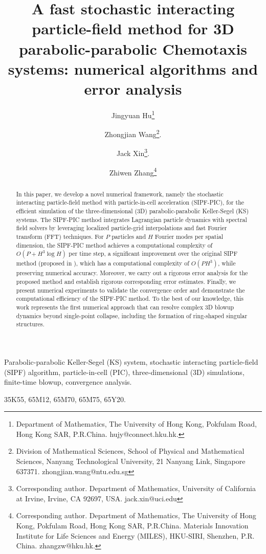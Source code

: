\documentclass[review,onefignum,onetabnum]{siamart250211}
\title{A fast stochastic interacting particle-field method for 3D parabolic-parabolic Chemotaxis  systems: numerical algorithms and error analysis}
\author{Jingyuan Hu\thanks{Department of Mathematics, The University of Hong Kong, Pokfulam Road, Hong Kong SAR,
P.R.China. hujy@connect.hku.hk.}
\and Zhongjian Wang\thanks{Division of Mathematical Sciences, School of Physical and Mathematical Sciences, Nanyang Technological University, 21 Nanyang Link, Singapore 637371. zhongjian.wang@ntu.edu.sg}.
\and Jack Xin\thanks{Corresponding author. Department of Mathematics, University of California at Irvine, Irvine, CA 92697, USA.
jack.xin@uci.edu}.
\and Zhiwen Zhang\thanks{Corresponding author. Department of Mathematics, The University of Hong Kong, Pokfulam
Road, Hong Kong SAR, P.R.China. Materials Innovation Institute for Life Sciences and Energy
(MILES), HKU-SIRI, Shenzhen, P.R. China. zhangzw@hku.hk.}
}
\date{}
\begin{document}
\maketitle



\begin{abstract}
In this paper, we develop a novel numerical framework, namely the stochastic interacting particle-field method with particle-in-cell acceleration (SIPF-PIC), for the efficient simulation of the three-dimensional (3D) parabolic-parabolic Keller-Segel (KS) systems. The SIPF-PIC method integrates Lagrangian particle dynamics with spectral field solvers by leveraging localized particle-grid interpolations and fast Fourier transform (FFT) techniques. For $P$ particles and $H$ Fourier modes per spatial dimension, the SIPF-PIC method achieves a computational complexity of $O(P + H^3 \log H)$ per time step, a significant improvement over the original SIPF method (proposed in \cite{SIPF1}), which has a computational complexity of $O(PH^3)$, while preserving numerical accuracy. Moreover, we carry out a rigorous error analysis for the proposed method and establish rigorous corresponding error estimates. Finally, we present numerical experiments to validate the convergence order and demonstrate the computational efficiency of the SIPF-PIC method. To the best of our knowledge, this work represents the first numerical approach that can resolve complex 3D blowup dynamics beyond single-point collapse, including the formation of ring-shaped singular structures.



\end{abstract}

\begin{keywords}
Parabolic-parabolic Keller-Segel (KS) system, stochastic interacting particle-field (SIPF) algorithm, particle-in-cell (PIC), three-dimensional (3D) simulations, finite-time blowup, convergence analysis.
\end{keywords}

\begin{MSCcodes}
 35K55,  65M12,  65M70,   65M75,  65Y20.
\end{MSCcodes}

\end{document}
